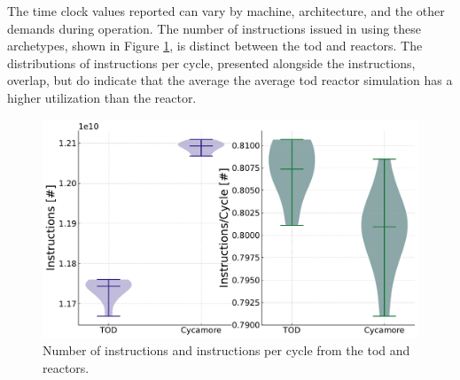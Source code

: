 The time clock values reported can vary by machine, architecture, and the other demands during operation. The number of instructions issued in using these archetypes, shown in Figure \ref{fig:isn_violin}, is distinct between the \gls{tod} and \cycamore reactors. The distributions of instructions per cycle, presented alongside the instructions, overlap, but do indicate that the average the average \gls{tod} reactor simulation has a higher utilization than the \cycamore reactor.

\begin{figure}[H]
    \centering
    \includegraphics[width=0.9\linewidth]{images/power_reactor/ins_cyc_both.pdf}
    \caption{Number of instructions and instructions per cycle from the \gls{tod} and \cycamore reactors.}
    \label{fig:isn_violin}
\end{figure}
